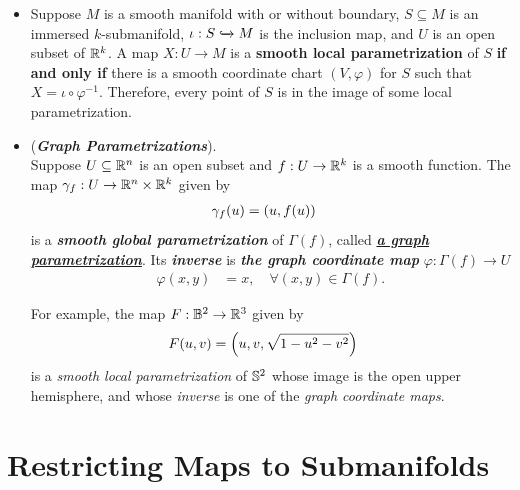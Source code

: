 \documentclass[11pt]{article}
\begin{document}
\begin{itemize}
\item \begin{proposition}
Suppose $M$ is a smooth manifold with or without boundary, $S \subseteq M$ is an immersed $k$-submanifold, $\iota: S \xhookrightarrow{} M$ is the inclusion map, and $U$ is an open subset of ${\mathbb R}^k$. A map $X: U \rightarrow M$ is a \textbf{smooth local parametrization} of $S$ \textbf{if and only if} there is a smooth coordinate chart $(V, \varphi)$ for $S$ such that \underline{$X = \iota \circ \varphi^{-1}$}. Therefore, every point of $S$ is in the image of some local parametrization.
\end{proposition}

\item \begin{example} (\emph{\textbf{Graph Parametrizations}}). \\
Suppose $U \subseteq {\mathbb R}^n$ is an open subset and $f: U \rightarrow {\mathbb R}^k$ is a smooth function. The map $\gamma_f: U \rightarrow {\mathbb R}^n \times {\mathbb R}^k$ given by
\begin{align*}
\gamma_f(u) &= \left(u, f(u)\right) 
\end{align*}
is a \emph{\textbf{smooth global parametrization}} of $\Gamma(f)$, called \underline{\emph{\textbf{a graph parametrization}}}. Its \emph{\textbf{inverse}} is \emph{\textbf{the graph coordinate map}} $\varphi: \Gamma(f) \rightarrow U$
\begin{align*}
\varphi(x, y) &= x,\quad \forall (x, y) \in \Gamma(f).
\end{align*}

For example, the map $F: {\mathbb B}^2 \rightarrow {\mathbb R}^3$ given by
\begin{align*}
F(u,v) &= \left(u, v, \sqrt{1 - u^2 - v^2}\right)
\end{align*} is a \emph{smooth local parametrization} of ${\mathbb S}^2$ whose image is the open upper hemisphere, and whose \emph{inverse} is one of the \emph{graph coordinate maps}.
\end{example}
\end{itemize}

\section{Restricting Maps to Submanifolds}
\end{document}
